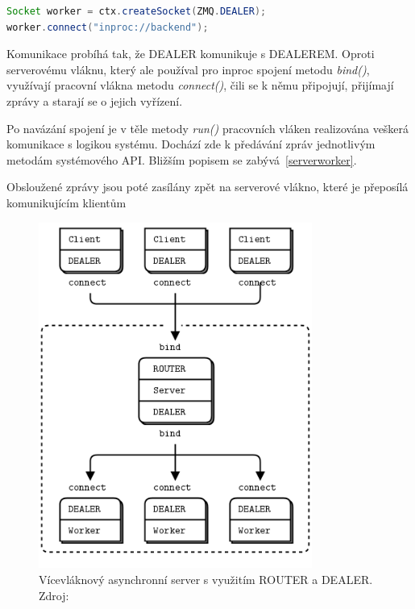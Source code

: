 \documentclass[thesis=M,czech]{FITthesis}[2014/05/07]
\begin{document}
\begin{lstlisting}[language=java]
Socket worker = ctx.createSocket(ZMQ.DEALER);
worker.connect("inproc://backend");
\end{lstlisting}

Komunikace probíhá tak, že DEALER komunikuje s DEALEREM. Oproti serverovému vláknu, který ale používal pro inproc spojení metodu \emph{bind()}, využívají pracovní vlákna metodu \emph{connect()}, čili se k němu připojují, přijímají zprávy a starají se o jejich vyřízení.

Po navázání spojení je v těle metody \emph{run()} pracovních vláken realizována veškerá komunikace s logikou systému. Dochází zde k předávání zpráv jednotlivým metodám systémového API. Bližším popisem se zabývá~\ref{serverworker}. 

Obsloužené zprávy jsou poté zasílány zpět na serverové vlákno, které je přeposílá komunikujícím klientům

\begin{figure}\centering
	\includegraphics[width=0.8\textwidth]{obr/multithreadingServer.png}
 	\caption[Vícevláknový asynchronní server s využitím ROUTER a DEALER.]{Vícevláknový asynchronní server s využitím ROUTER a DEALER. Zdroj: \cite{mtserver}}\label{fig:mtserver}
\end{figure}	
\end{document}
